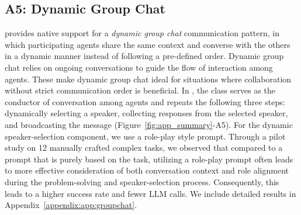 
\subsection*{A5: Dynamic Group Chat 
} \label{sec:app:groupchat}

\newcommand{\alice}{\text{Alice}\xspace}
\newcommand{\bob}{\text{Bob}\xspace}

\newcommand{\userproxy}{\text{User Proxy}\xspace}


\libName provides native support for a \emph{dynamic group chat} communication pattern, in which participating agents share the same context and converse with the others in a dynamic manner instead of following a pre-defined order. 
Dynamic group chat relies on ongoing conversations to guide the flow of interaction among agents. 
These make dynamic group chat ideal for situations where collaboration without strict communication order is beneficial.  
In \libName, the \groupchatmanager class serves as the conductor of conversation among agents and repeats the following three steps: dynamically selecting a speaker, collecting responses from the selected speaker, and broadcasting the message (Figure~\ref{fig:app_summary}-A5). For the dynamic speaker-selection component, we use a role-play style prompt. 
Through a pilot study on 12 manually crafted complex tasks, we observed that compared to a prompt that is purely based on the task, utilizing a role-play prompt often leads to more effective consideration of both conversation context and role alignment during the problem-solving and speaker-selection process. Consequently, this leads to a higher success rate and fewer LLM calls. We include detailed results in Appendix~\ref{appendix:app:groupchat}.